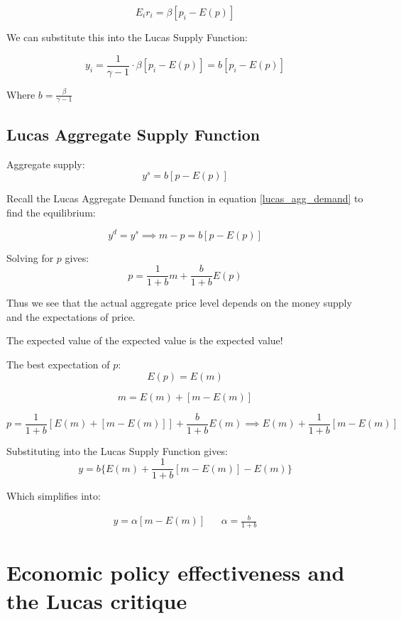 $$
E_i r_i = \beta \left[  p_i - E(p)  \right]
$$

We can substitute this into the Lucas Supply Function:

$$
y_i = \frac{1}{\gamma - 1} \cdot \beta \left[  p_i - E(p)  \right] = b \left[  p_i - E(p)  \right]
$$

Where $b = \tfrac{\beta}{\gamma - 1}$
\subsection*{Lucas Aggregate Supply Function}

Aggregate supply:
\begin{equation*}
   y^s = b [ p - E ( p ) ] 
\end{equation*}

Recall the Lucas Aggregate Demand function in equation \ref{lucas_agg_demand} to find the equilibrium:

$$
y^d = y^s \implies
m - p = b [ p - E( p ) ]
$$

Solving for $p$ gives: 
$$
p = \frac{1}{1+b}m + \frac{b}{1 + b}E(p)
$$

Thus we see that the actual aggregate price level depends on the money supply and the expectations of price. 

\begin{tcolorbox}
The expected value of the expected value is the expected value!
\end{tcolorbox}

The best expectation of $p$:
$$
E(p) = E(m)
$$

$$
m = E(m) + \left[  m - E(m) \right] 
$$

$$
p = \frac{1}{1 +b} \left[ E(m) + [m - E(m)] \right] + \frac{b}{1 + b} E(m) \implies E(m) + \frac{1}{1 + b} \left[ m - E(m) \right]
$$


Substituting into the Lucas Supply Function gives:
$$
y = b \Bigg\{ E(m) + \frac{1}{1 + b} [m - E(m)] - E(m) \Bigg\}
$$

Which simplifies into:

\begin{align}
        y = \alpha [m - E(m)] && \alpha = \frac{b}{1 + b}
\end{align}



\clearpage

\section{Economic policy effectiveness and the Lucas critique}


